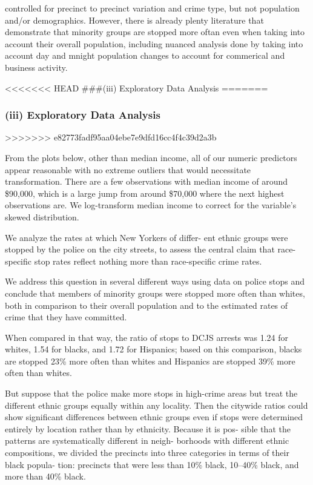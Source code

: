 \documentclass[]{article}
\begin{document}
controlled for precinct to precinct variation and crime type, but not
population and/or demographics. However, there is already plenty
literature that demonstrate that minority groups are stopped more oftan
even when taking into account their overall population, including
nuanced analysis done by taking into account day and mnight population
changes to account for commerical and business activity.

<<<<<<< HEAD
\#\#\#(iii) Exploratory Data Analysis
=======
\hypertarget{iii-exploratory-data-analysis}{%
\subsubsection{(iii) Exploratory Data
Analysis}\label{iii-exploratory-data-analysis}}
>>>>>>> e82773fadf95aa04ebe7e9dfd16cc4f4c39d2a3b

From the plots below, other than median income, all of our numeric
predictors appear reasonable with no extreme outliers that would
necessitate transformation. There are a few observations with median
income of around \$90,000, which is a large jump from around \$70,000
where the next highest observations are. We log-transform median income
to correct for the variable's skewed distribution.

We analyze the rates at which New Yorkers of differ- ent ethnic groups
were stopped by the police on the city streets, to assess the central
claim that race-specific stop rates reflect nothing more than
race-specific crime rates.

We address this question in several different ways using data on police
stops and conclude that members of minority groups were stopped more
often than whites, both in comparison to their overall population and to
the estimated rates of crime that they have committed.

When compared in that way, the ratio of stops to DCJS arrests was 1.24
for whites, 1.54 for blacks, and 1.72 for Hispanics; based on this
comparison, blacks are stopped 23\% more often than whites and Hispanics
are stopped 39\% more often than whites.

But suppose that the police make more stops in high-crime areas but
treat the different ethnic groups equally within any locality. Then the
citywide ratios could show significant differences between ethnic groups
even if stops were determined entirely by location rather than by
ethnicity. Because it is pos- sible that the patterns are systematically
different in neigh- borhoods with different ethnic compositions, we
divided the precincts into three categories in terms of their black
popula- tion: precincts that were less than 10\% black, 10--40\% black,
and more than 40\% black.
\end{document}
